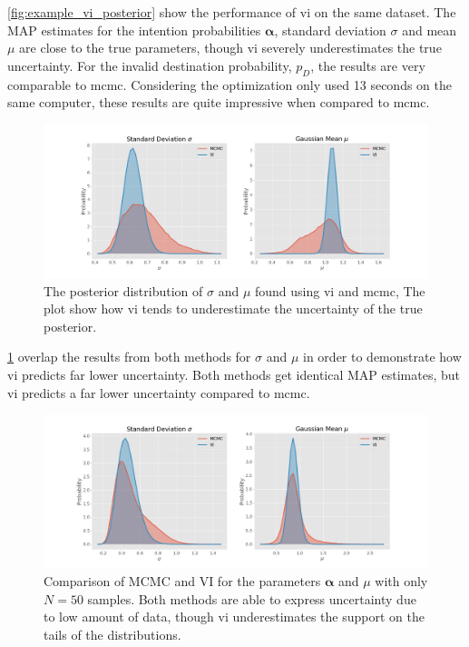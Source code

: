 \cref{fig:example_vi_posterior} show the performance of  \acrshort{vi} on the same dataset. The MAP estimates for the intention probabilities $\boldsymbol{\alpha}$, standard deviation $\sigma$ and mean $\mu$ are close to the true parameters, though \acrshort{vi} severely underestimates the true uncertainty. For the invalid destination probability, $p_D$, the results are very comparable to \acrshort{mcmc}. Considering the optimization only used 13 seconds on the same computer, these results are quite impressive when compared to \acrshort{mcmc}.

\begin{figure}[h]
    \centering
    \includegraphics[width=\textwidth]{figures/example_vi_mcmc_comparison.png}
    \caption{The posterior distribution of $\sigma$ and $\mu$ found using \acrshort{vi} and \acrshort{mcmc}, The plot show how \acrshort{vi} tends to underestimate the uncertainty of the true posterior.}
    \label{fig:example_mcmc_vi_alphas}
\end{figure}

\cref{fig:example_mcmc_vi_alphas} overlap the results from both methods for $\sigma$ and $\mu$ in order to demonstrate how \acrshort{vi} predicts far lower uncertainty. Both methods get identical MAP estimates, but \acrshort{vi} predicts a far lower uncertainty compared to \acrshort{mcmc}. 

\begin{figure}[h]
    \centering
    \includegraphics[width=\textwidth]{figures/example_vi_mcmc_comparison_low_N.png}
    \caption{Comparison of MCMC and VI for the parameters $\boldsymbol{\alpha}$ and $\mu$ with only $N=50$ samples. Both methods are able to express uncertainty due to low amount of data, though \acrshort{vi} underestimates the support on the tails of the distributions.}
    \label{fig:example_mcmc_vi_low_N}
\end{figure}

